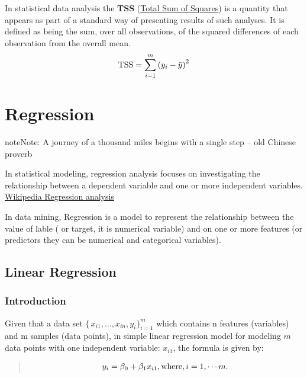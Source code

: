 \documentclass[letterpaper,11pt,english]{sphinxmanual}
\begin{document}
In statistical data analysis the \textbf{TSS} (\href{https://en.wikipedia.org/wiki/Total\_sum\_of\_squares}{Total Sum of Squares}) is a quantity that appears as part of a standard way of presenting results of such analyses. It is defined as being the sum, over all observations, of the squared differences of each observation from the overall mean.
\begin{gather}
\begin{split}\text{TSS} =  \sum_{i=1}^m\left( y_i-\bar{y}\right)^2\end{split}\notag
\end{gather}

\chapter{Regression}
\label{regression:total-sum-of-squares}\label{regression::doc}\label{regression:regression}\label{regression:id1}
\begin{notice}{note}{Note:}
A journey of a thousand miles begins with a single step -- old Chinese proverb
\end{notice}

In statistical modeling, regression analysis focuses on investigating the relationship between a dependent variable and one or more independent variables. \href{https://en.wikipedia.org/wiki/Regression\_analysis}{Wikipedia Regression analysis}

In data mining, Regression is a model to represent the relationship between the value of lable ( or target, it is numerical variable) and on one or more features (or predictors they can be numerical and categorical variables).


\section{Linear Regression}
\label{regression:linear-regression}

\subsection{Introduction}
\label{regression:introduction}
Given that a data set \({\displaystyle \{\,x_{i1},\ldots ,x_{in},y_{i}\}_{i=1}^{m}}\) which contains n features
(variables) and m samples (data points), in simple linear regression model for modeling \({\displaystyle m}\) data points with one independent variable: \({\displaystyle x_{i1}}\), the formula is given by:
\begin{quote}
\begin{gather}
\begin{split}y_i = \beta_0 + \beta_1 x_{i1}, \text{where}, i= 1, \cdots m.\end{split}\notag
\end{gather}\end{quote}
\end{document}

